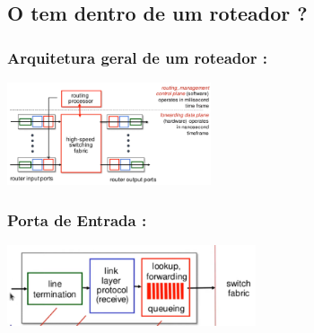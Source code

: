     \subsection{O tem dentro de um roteador ?}
        
        \subsubsection{Arquitetura geral de um roteador :}
        
            \begin{center}
                \includegraphics[width=0.45\textwidth]{img/cap-04/arquitetura-geral-roteador.png}
            \end{center}

        \subsubsection{Porta de Entrada :}
            
            \begin{center}
                \includegraphics[width=0.55\textwidth]{img/cap-04/porta-de-entrada.png}
            \end{center}

